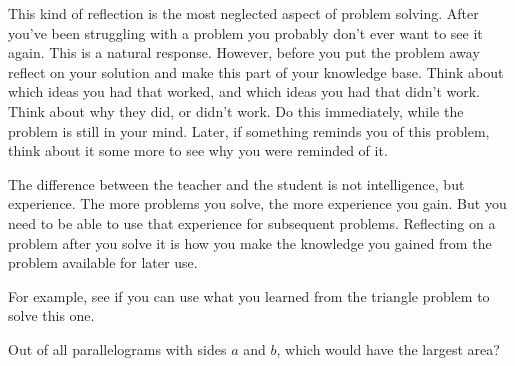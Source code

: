 \begin{description}
This kind of reflection is the most neglected aspect of problem
solving. After you've been struggling with a problem you probably
don't ever want to see it again.  This is a natural response.
However, before you put the problem away reflect on your solution and
make this part of your knowledge base. Think about which ideas you had
that worked, and which ideas you had that didn't work. Think about
\alert{why} they did, or didn't work. Do this immediately, while the
problem is still in your mind. Later, if something reminds you of this
problem, think about it some more to see why you were reminded of it.

The difference between the teacher and the student is not
intelligence, but experience.  The more problems you solve, the more
experience you gain. But you need to be able to use that experience
for subsequent problems. Reflecting on a problem after you solve it is
how you make the knowledge you gained from the problem available for
later use.


For example, see if you can use what you learned from the triangle
problem to solve this one.
\end{description}
\begin{embeddedproblem-1line}{}
  Out of all parallelograms with sides $a$ and $b$, which would have the
  largest area?
\end{embeddedproblem-1line}
